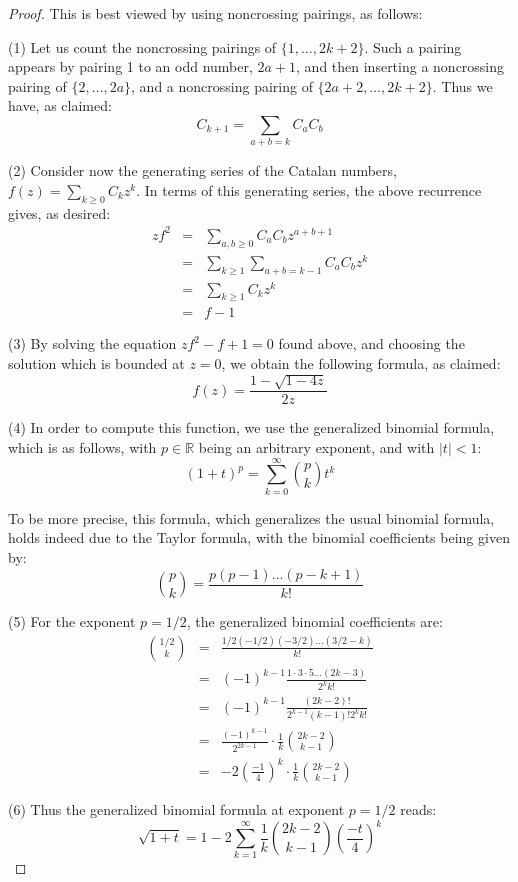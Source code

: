 \documentclass[12pt]{amsbook}
\begin{document}
\begin{proof}
This is best viewed by using noncrossing pairings, as follows: 

\medskip

(1) Let us count the noncrossing pairings of $\{1,\ldots,2k+2\}$. Such a pairing appears by pairing 1 to an odd number, $2a+1$, and then inserting a noncrossing pairing of $\{2,\ldots,2a\}$, and a noncrossing pairing of $\{2a+2,\ldots,2k+2\}$. Thus we have, as claimed:
$$C_{k+1}=\sum_{a+b=k}C_aC_b$$ 

(2) Consider now the generating series of the Catalan numbers, $f(z)=\sum_{k\geq0}C_kz^k$. In terms of this generating series, the above recurrence gives, as desired:
\begin{eqnarray*}
zf^2
&=&\sum_{a,b\geq0}C_aC_bz^{a+b+1}\\
&=&\sum_{k\geq1}\sum_{a+b=k-1}C_aC_bz^k\\
&=&\sum_{k\geq1}C_kz^k\\
&=&f-1
\end{eqnarray*}

(3) By solving the equation $zf^2-f+1=0$ found above, and choosing the solution which is bounded at $z=0$, we obtain the following formula, as claimed:
$$f(z)=\frac{1-\sqrt{1-4z}}{2z}$$ 

(4) In order to compute this function, we use the generalized binomial formula, which is as follows, with $p\in\mathbb R$ being an arbitrary exponent, and with $|t|<1$:
$$(1+t)^p=\sum_{k=0}^\infty\binom{p}{k}t^k$$

To be more precise, this formula, which generalizes the usual binomial formula, holds indeed due to the Taylor formula, with the binomial coefficients being given by:
$$\binom{p}{k}=\frac{p(p-1)\ldots(p-k+1)}{k!}$$

(5) For the exponent $p=1/2$, the generalized binomial coefficients are:
\begin{eqnarray*}
\binom{1/2}{k}
&=&\frac{1/2(-1/2)(-3/2)\ldots(3/2-k)}{k!}\\
&=&(-1)^{k-1}\frac{1\cdot 3\cdot 5\ldots(2k-3)}{2^kk!}\\
&=&(-1)^{k-1}\frac{(2k-2)!}{2^{k-1}(k-1)!2^kk!}\\
&=&\frac{(-1)^{k-1}}{2^{2k-1}}\cdot\frac{1}{k}\binom{2k-2}{k-1}\\
&=&-2\left(\frac{-1}{4}\right)^k\cdot\frac{1}{k}\binom{2k-2}{k-1}
\end{eqnarray*}

(6) Thus the generalized binomial formula at exponent $p=1/2$ reads:
$$\sqrt{1+t}=1-2\sum_{k=1}^\infty\frac{1}{k}\binom{2k-2}{k-1}\left(\frac{-t}{4}\right)^k$$


\end{proof}
\end{document}
